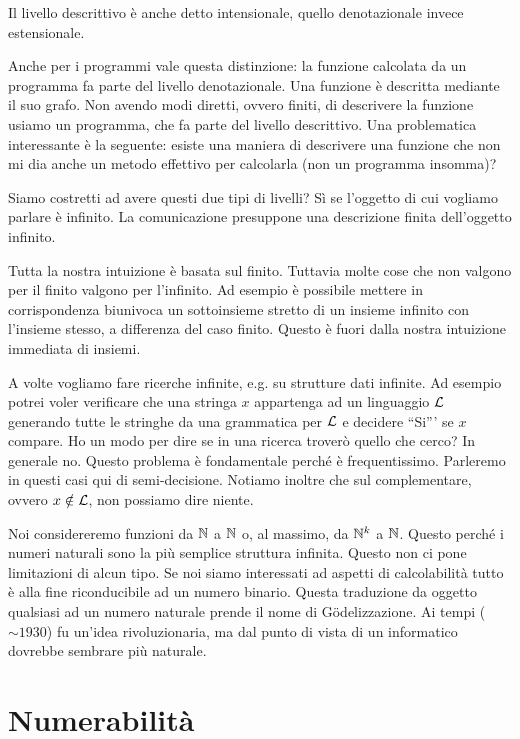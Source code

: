 Il livello descrittivo è anche detto intensionale, quello denotazionale invece estensionale.

Anche per i programmi vale questa distinzione: la funzione calcolata da un programma fa parte del
livello denotazionale. Una funzione è descritta mediante il suo grafo. Non avendo modi diretti,
ovvero finiti, di descrivere la funzione usiamo un programma, che fa parte del livello descrittivo.
Una problematica interessante è la seguente: esiste una maniera di descrivere una funzione che non
mi dia anche un metodo effettivo per calcolarla (non un programma insomma)? 

Siamo costretti ad avere questi due tipi di livelli? Sì se l'oggetto di cui vogliamo parlare è
infinito. La comunicazione presuppone una descrizione finita dell'oggetto infinito.

Tutta la nostra intuizione è basata sul finito. Tuttavia molte cose che non valgono per il finito
valgono per l'infinito. Ad esempio è possibile mettere in corrispondenza biunivoca un sottoinsieme
stretto di un insieme infinito con l'insieme stesso, a differenza del caso finito. Questo è fuori
dalla nostra intuizione immediata di insiemi.

A volte vogliamo fare ricerche infinite, e.g. su strutture dati infinite. Ad esempio potrei voler
verificare che una stringa $x$ appartenga ad un linguaggio $\mathcal{L}$ generando tutte le stringhe da
una grammatica per $\mathcal{L}$ e decidere ``Si''' se $x$ compare. Ho un modo per dire se in una ricerca
troverò quello che cerco? In generale no. Questo problema è fondamentale perché è
frequentissimo. Parleremo in questi casi qui di semi-decisione. Notiamo inoltre che sul
complementare, ovvero $x \notin \mathcal{L}$, non possiamo dire niente.

Noi considereremo funzioni da $\mathbb{N}$ a $\mathbb{N}$ o, al massimo, da $\mathbb{N}^{k}$ a $\mathbb{N}$. Questo perché
i numeri naturali sono la più semplice struttura infinita. Questo non ci pone limitazioni di alcun
tipo. Se noi siamo interessati ad aspetti di calcolabilità tutto è alla fine riconducibile ad un
numero binario. Questa traduzione da oggetto qualsiasi ad un numero naturale prende il nome di
Gödelizzazione. Ai tempi ($\sim 1930$) fu un'idea rivoluzionaria, ma dal punto di vista di un informatico
dovrebbe sembrare più naturale.

\section{Numerabilità}

